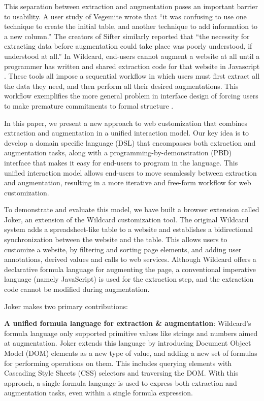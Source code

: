 \documentclass[sigconf,10pt]{acmart}
\begin{document}
This separation between extraction and augmentation poses an important
barrier to usability. A user study \citep{lin2009} of Vegemite wrote
that ``it was confusing to use one technique to create the initial
table, and another technique to add information to a new column.'' The
creators of Sifter similarly reported \citep{huynh2006} that ``the
necessity for extracting data before augmentation could take place was
poorly understood, if understood at all.'' In Wildcard, end-users cannot
augment a website at all until a programmer has written and shared
extraction code for that website in Javascript \citep{litt2020}. These
tools all impose a sequential workflow in which users must first extract
all the data they need, and then perform all their desired
augmentations. This workflow exemplifies the more general problem in
interface design of forcing users to make premature commitments to
formal structure \citep{shipman1999, blackwell2001}.

In this paper, we present a new approach to web customization that
combines extraction and augmentation in a unified interaction model. Our
key idea is to develop a domain specific language (DSL) that encompasses
both extraction and augmentation tasks, along with a
programming-by-demonstration (PBD) interface that makes it easy for
end-users to program in the language. This unified interaction model
allows end-users to move seamlessly between extraction and augmentation,
resulting in a more iterative and free-form workflow for web
customization.

To demonstrate and evaluate this model, we have built a browser
extension called Joker, an extension of the Wildcard customization tool.
The original Wildcard system \citep{litt2020} adds a spreadsheet-like
table to a website and establishes a bidirectional synchronization
between the website and the table. This allows users to customize a
website, by filtering and sorting page elements, and adding user
annotations, derived values and calls to web services. Although Wildcard
offers a declarative formula language for augmenting the page, a
conventional imperative language (namely JavaScript) is used for the
extraction step, and the extraction code cannot be modified during
augmentation.

Joker makes two primary contributions:

\textbf{A unified formula language for extraction \& augmentation}:
Wildcard's formula language only supported primitive values like strings
and numbers aimed at augmentation. Joker extends this language by
introducing Document Object Model (DOM) elements as a new type of value,
and adding a new set of formulas for performing operations on them. This
includes querying elements with Cascading Style Sheets (CSS) selectors
and traversing the DOM. With this approach, a single formula language is
used to express both extraction and augmentation tasks, even within a
single formula expression.
\end{document}

